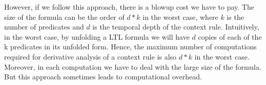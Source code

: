 \noindent
However, if we follow this approach, there is a blowup cost we have to pay.
The size of the formula can be the order of $d*k$ in the worst case, 
where $k$ is the number of predicates and $d$ is the temporal depth of the context rule. 
Intuitively, in the worst case, by unfolding a LTL formula we will have $d$ copies of each of the k predicates in its unfolded form.
Hence, the 
maximum number of computations required for derivative analysis of a context rule is also $d*k$  in the worst case.
Moreover, in each computation we have to deal with the large size of the formula.
But this approach sometimes leads to computational overhead.

\begin{comment}
\begin{example}
 Let, ${\cal{C}} = q + G^{(5)}(p)$ be a context rule. We want to find the derivative with respect to $p^{(3)}$.
 ${\cal{C}} = q + p^{(3)}. (p^{(0)}.p^{(1)}.p^{(2)}.p^{(4)}.p^{(5)})$.
 Then we get the following after recursion:\\
 $\partial{\cal{C}}/\partial{p^{(3)}} = {\bar{q}}.p^{(0)}.p^{(1)}.p^{(2)}.p^{(4)}.p^{(5)}.\partial p^{(3)}/\partial{p^{(3)}}$
 \hfill$\blacksquare$
\end{example}
\vspace{1.5mm}
\end{comment}








